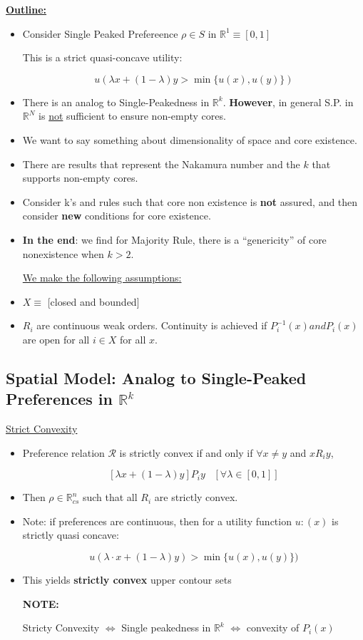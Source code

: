 \documentclass{article}
\newcommand{\RR}{\mathbb{R}}
\newcommand{\R}{\mathcal{R}}
\begin{document}
\textbf{\underline{Outline:}}
\begin{itemize}
  \item Consider Single Peaked Prefereence $\rho \in S$ in $\RR^1 \equiv [0,1]$

  This is a strict quasi-concave utility:

  \[
  u(\lambda x + (1-\lambda) y > \min\{u(x),u(y)\})
  \]

\item There is an analog to Single-Peakedness in $\RR^k$. \textbf{However}, in general S.P. in $\RR^N$ is \underline{not} sufficient to ensure non-empty cores.
\item We want to say something about dimensionality of space and core existence.
\item There are results that represent the Nakamura number and the $k$ that supports non-empty cores.
\item Consider k's and rules such that core non existence is \textbf{not} assured, and then consider \textbf{new} conditions for core existence.

\item \textbf{In the end}: we find for Majority Rule, there is a ``genericity'' of core nonexistence when $k>2$.

\underline{We make the following assumptions:
}
\item $X \equiv $ [closed and bounded]
\item $R_i$ are continuous weak orders. Continuity is achieved if $P_i^{-1}(x) and P_i(x)$ are open for all $i \in X$ for all $x$.

\end{itemize}


\subsection*{Spatial Model: Analog to Single-Peaked Preferences in $\RR^k$}

\underline{Strict Convexity}

\begin{itemize}

\item Preference relation $\R$ is strictly convex if and only if $\forall x \neq y$ and $xR_iy$, 

\[
[\lambda x + (1-\lambda)y] P_i y \;\;\; [\forall \lambda \in [0,1]]
\]
\item Then $\rho \in \RR^n_{cs}$ such that all $R_i$ are strictly convex.


\item Note: if preferences are continuous, then for a utility function $u:(x)$ is strictly quasi concave:

\[
u(\lambda \cdot x + (1-\lambda) y) > \min \{u(x),u(y)\})
\]

\item This yields \textbf{strictly convex} upper contour sets

\textbf{NOTE:} 

Stricty Convexity $\Leftrightarrow$ Single peakedness in $\RR^k$ $\Leftrightarrow$ convexity of $P_i(x)$

\end{itemize}
\end{document}
